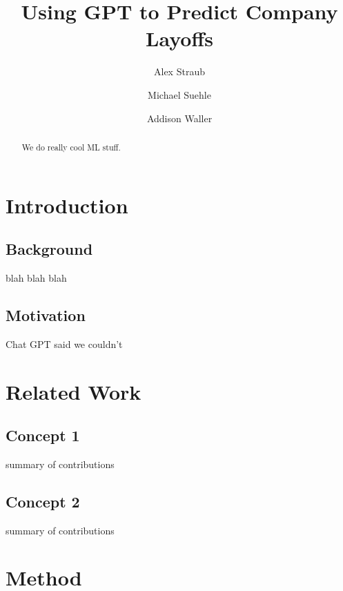 \documentclass[10pt]{article}
\title{Using GPT to Predict Company Layoffs}
\author{ Alex Straub \and Michael Suehle \and Addison Waller\\}
\begin{document}
\maketitle

\begin{abstract}
  We do really cool ML stuff.
\end{abstract}

%
% 

\section{Introduction}

\subsection{Background}

blah blah blah

\subsection{Motivation}

Chat GPT said we couldn't


%
% 

\section{Related Work}

\subsection{Concept 1}
summary of contributions

\subsection{Concept 2}
summary of contributions


%
% 

\section{Method}
\end{document}
